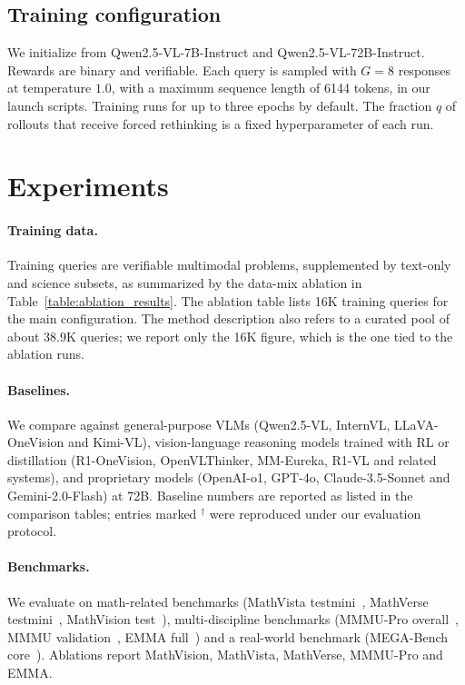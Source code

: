 \documentclass{article}
\begin{document}
\subsection{Training configuration}

We initialize from Qwen2.5-VL-7B-Instruct and Qwen2.5-VL-72B-Instruct. Rewards are binary and verifiable. Each query is sampled with $G=8$ responses at temperature $1.0$, with a maximum sequence length of 6144 tokens, in our launch scripts. Training runs for up to three epochs by default. The fraction $q$ of rollouts that receive forced rethinking is a fixed hyperparameter of each run.

\section{Experiments}

\paragraph{Training data.} Training queries are verifiable multimodal problems, supplemented by text-only and science subsets, as summarized by the data-mix ablation in Table~\ref{table:ablation_results}. The ablation table lists 16K training queries for the main configuration. The method description also refers to a curated pool of about 38.9K queries; we report only the 16K figure, which is the one tied to the ablation runs.

\paragraph{Baselines.} We compare against general-purpose VLMs (Qwen2.5-VL, InternVL, LLaVA-OneVision and Kimi-VL), vision-language reasoning models trained with RL or distillation (R1-OneVision, OpenVLThinker, MM-Eureka, R1-VL and related systems), and proprietary models (OpenAI-o1, GPT-4o, Claude-3.5-Sonnet and Gemini-2.0-Flash) at 72B. Baseline numbers are reported as listed in the comparison tables; entries marked $^\dagger$ were reproduced under our evaluation protocol.

\paragraph{Benchmarks.} We evaluate on math-related benchmarks (MathVista testmini~\cite{mathvista}, MathVerse testmini~\cite{mathverse}, MathVision test~\cite{mathvision}), multi-discipline benchmarks (MMMU-Pro overall~\cite{mmmupro}, MMMU validation~\cite{yue2024mmmu}, EMMA full~\cite{emma}) and a real-world benchmark (MEGA-Bench core~\cite{chen2024mega}). Ablations report MathVision, MathVista, MathVerse, MMMU-Pro and EMMA.
\end{document}
